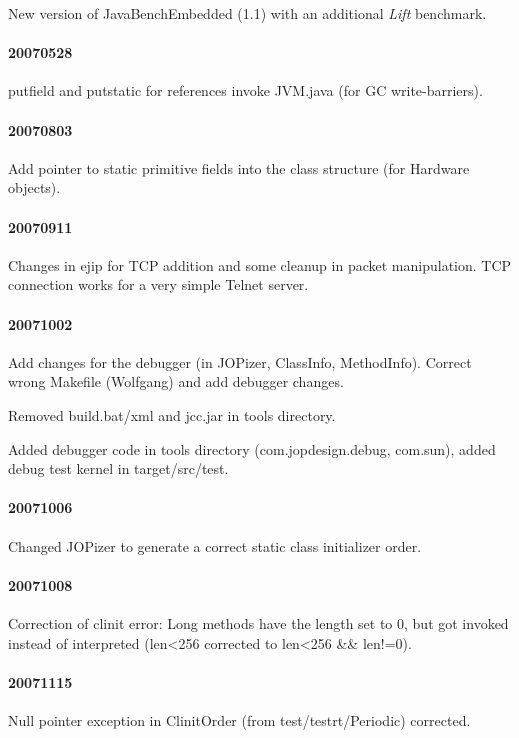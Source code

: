 \documentclass[a4paper,12pt]{scrartcl}
\begin{document}
New version of JavaBenchEmbedded (1.1) with an additional \emph{Lift}
benchmark.

\paragraph{20070528}

putfield and putstatic for references invoke JVM.java (for GC
write-barriers).

\paragraph{20070803}

Add pointer to static primitive fields into the class structure (for
Hardware objects).

\paragraph{20070911} Changes in ejip for TCP addition and some
cleanup in packet manipulation. TCP connection works for a very simple
Telnet server.

\paragraph{20071002} Add changes for the debugger (in JOPizer, ClassInfo, MethodInfo).
Correct wrong Makefile (Wolfgang) and add debugger changes.

Removed build.bat/xml and jcc.jar in tools directory.

Added debugger code in tools directory (com.jopdesign.debug,
com.sun), added debug test kernel in target/src/test.

\paragraph{20071006} Changed JOPizer to generate a correct static
class initializer order.

\paragraph{20071008} Correction of clinit error: Long methods have
the length set to 0, but got invoked instead of interpreted (len<256
corrected to len<256 \&\& len!=0).

\paragraph{20071115} Null pointer exception in ClinitOrder
(from test/testrt/Periodic) corrected.
\end{document}
